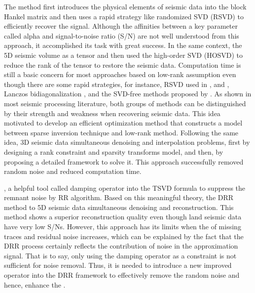 The  method first introduces the physical elements of seismic data into the block Hankel matrix and then uses a rapid strategy like randomized SVD (RSVD) to efficiently recover the signal. Although the affinities between a key parameter called alpha and signal-to-noise ratio (S/N) are not well understood from this approach, it accomplished its task with great success. In the same context, \citet{kreimer2012tensor}  the 5D seismic volume as a tensor and then used the high-order SVD (HOSVD) to reduce the rank of the tensor to restore the seismic data. Computation time is still a basic concern for most approaches based on low-rank assumption even though there are some rapid strategies, for instance, RSVD used in \cite{rokhlin2009randomized}, \cite{oropeza2011simultaneous} and \cite{chen2016simultaneous}, Lanczos bidiagonalization \citep{gao2013fast}, and the SVD-free methods proposed by \cite{gao2015parallel}. As shown in most seismic processing literature, both groups of methods  can be distinguished by their strength and weakness when recovering seismic data. This idea motivated \cite{sternfels2015multidimensional} to develop an efficient optimization method that constructs a model between sparse inversion technique and low-rank method. Following the same idea, \citet{zhang2017hybrid}  3D seismic data simultaneous denoising and interpolation problems, first by designing a rank constraint and sparsity transforms model, and then, by proposing a detailed framework to solve it. This approach successfully removed random noise and reduced computation time. 

, \citet{huang2016damped}  a helpful tool called damping operator into the TSVD formula to suppress the remnant noise by RR algorithm. Based on this meaningful theory, 
\citet{chen2016simultaneous}  the DRR method \citep{huang2016damped} to 5D seismic data simultaneous denoising and reconstruction. This method shows a superior reconstruction quality even though land seismic data have very low S/Ns. However, this approach has its limits when the  of missing traces and residual noise increases, which can be explained by the fact that the DRR process certainly reflects the contribution of noise in the approximation signal. That is to say, only using the damping operator as a constraint is not sufficient for noise removal. Thus, it is needed to introduce a new improved operator into the DRR framework to effectively remove the random noise and hence, enhance the . 

